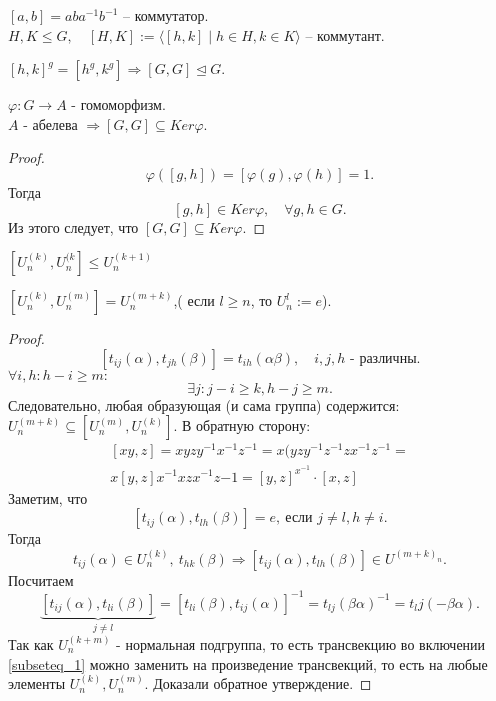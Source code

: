\documentclass[12pt]{report}
\begin{document}
\begin{defn}
    $[a, b] = aba^{-1}b^{-1}$ -- коммутатор.\\
    $H, K \le G, \quad [H, K]:= \langle [h, k] \mid h \in  H, k \in  K \rangle$ -- коммутант.
\end{defn}
\begin{st}
    $[h, k]^g = [h^g, k^g] \Rightarrow [G, G] \trianglelefteq G$.
\end{st}
\begin{st}
    $\varphi : G \to  A$ - гомоморфизм. \\
    $A$ - абелева $\Longrightarrow [G, G] \subseteq Ker \varphi $.
\end{st}
\begin{proof}
    \[
	\varphi ([g, h]) = [\varphi (g), \varphi (h)] = 1 
    .\] 
    Тогда \[
	[g, h] \in  Ker \varphi , \quad \forall g, h \in  G
    .\] 
    Из этого следует, что $[G, G] \subseteq  Ker \varphi $.
\end{proof}
\begin{cor}
    $[U_n^{(k)}, U_n^{(k}] \le U^{(k+1)}_n $
\end{cor}
\begin{lm}
    $[U_n^{(k)}, U_n^{(m)}] = U_n^{(m+k)}$,( если $l \ge n 	$, то $U^l_n := {e}$).
\end{lm}
\begin{proof}
\[
    [t_{ij}(\alpha ), t_{jh} (\beta )] = t_{ih} (\alpha \beta), \quad i, j, h \mbox{ - различны} 
.\]     
$\forall i, h : h - i \ge  m:$
\[
\exists j: j-i \ge k, h -j \ge m
.\] 
Следовательно, любая образующая (и сама группа) содержится: $U_n^{(m+k)}\subseteq [U_n^{(m)}, U_n^{(k)}] \label{subseteq_1}$.
В обратную сторону:
$$
\begin{array}{c}
[xy, z] = xyzy^{-1}x^{-1}z^{-1} = x (yzy^{-1}z^{-1}z x^{-1} z^{-1} =\\
x [y, z] x^{-1} x z x^{-1} z{-1} = [y, z]^{x^{-1}} \cdot [x, z]
\end{array}
$$
Заметим, что \[
    [t_{ij}(\alpha ) , t_{lh}(\beta )] = e, ~\mbox{если }j \ne l, h \ne i
.\] 
Тогда
\[
    t_{ij}(\alpha ) \in  U^{(k)}_n , ~ t_{hk}(\beta ) \Longrightarrow [t_{ij}(\alpha ), t_{lh}(\beta )] \in U^{(m+k)_n}
.\] 
Посчитаем 
\[
    \underbrace{[t_{ij}(\alpha ), t_{li}(\beta )] }_{\quad j \ne l } = [t_{li} (\beta), t_{ij} (\alpha ) ]^{-1} = t_{lj} (\beta \alpha )^{-1} = t_lj (-\beta \alpha ) 
.\] 
Так как $U_n^{(k+m)}$ - нормальная подгруппа, то есть трансвекцию во включении \ref{subseteq_1} можно заменить на произведение трансвекций, то есть на любые элементы $U_n^{(k)}, U_n^{(m)}$. Доказали обратное утверждение.
\end{proof}
\end{document}
